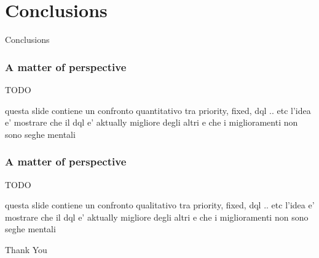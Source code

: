 \documentclass[dvipsnames]{beamer}
\begin{document}
\section{Conclusions}
\begin{frame}
\centering
\Huge
Conclusions
\end{frame}

\begin{frame}
\frametitle{A matter of perspective}
TODO

questa slide contiene un confronto quantitativo tra priority, fixed, dql .. etc
l'idea e' mostrare che il dql e' aktually migliore degli altri e che i miglioramenti non sono seghe mentali
\end{frame}

\begin{frame}
\frametitle{A matter of perspective}
TODO

questa slide contiene un confronto qualitativo tra priority, fixed, dql .. etc
l'idea e' mostrare che il dql e' aktually migliore degli altri e che i miglioramenti non sono seghe mentali
\end{frame}

\begin{frame}
\centering
\Huge
Thank You
\end{frame}
\end{document}
